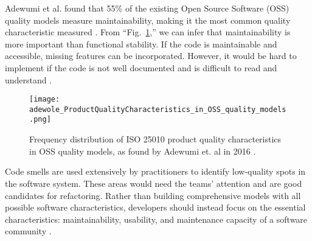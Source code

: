 Adewumi et al. found that 55\% of the existing Open Source Software (OSS) quality models measure maintainability, making it the most common quality characteristic measured \cite{adewumi:2016}. From ``Fig.~\ref{figFreqDistProductQualityModel},'' we can infer that maintainability is more important than functional stability. If the code is maintainable and accessible, missing features can be incorporated. However, it would be hard to implement if the code is not well documented and is difficult to read and understand \cite{adewumi:2016}.

\begin{figure}[ht]
  \centerline{
      \texttt{[image: adewole\_ProductQualityCharacteristics\_in\_OSS\_quality\_models.png]}
  }
  \caption{Frequency distribution of ISO 25010 product quality characteristics in OSS quality models, as found by Adewumi et. al in 2016 \cite{adewumi:2016}.}
  \label{figFreqDistProductQualityModel}
\end{figure}

Code smells are used extensively by practitioners to identify low-quality spots in the software system. These areas would need the teams' attention and are good candidates for refactoring. Rather than building comprehensive models with all possible software characteristics, developers should instead focus on the essential characteristics: maintainability, usability, and maintenance capacity of a software community \cite{adewumi:2016}.
